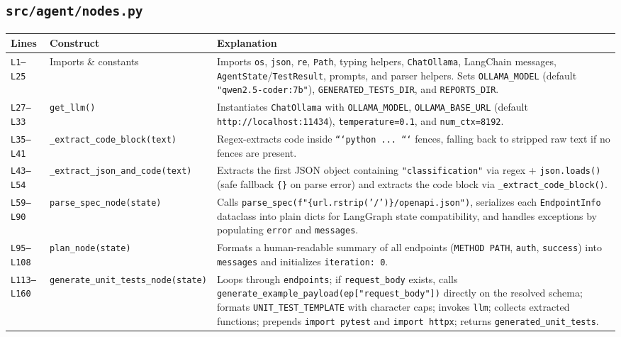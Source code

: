 \documentclass[11pt,a4paper]{article}
\begin{document}
\subsection{\texttt{src/agent/nodes.py}}
\begin{longtable}{L{1.4cm} L{5.2cm} L{9.0cm}}
\toprule
\textbf{Lines} & \textbf{Construct} & \textbf{Explanation} \\
\midrule
\endhead
\texttt{L1--L25} & Imports \& constants & Imports \texttt{os}, \texttt{json}, \texttt{re}, \texttt{Path}, typing helpers, \texttt{ChatOllama}, LangChain messages, \texttt{AgentState}/\texttt{TestResult}, prompts, and parser helpers. Sets \texttt{OLLAMA\_MODEL} (default \texttt{"qwen2.5-coder:7b"}), \texttt{GENERATED\_TESTS\_DIR}, and \texttt{REPORTS\_DIR}. \\
\texttt{L27--L33} & \texttt{get\_llm()} & Instantiates \texttt{ChatOllama} with \texttt{OLLAMA\_MODEL}, \texttt{OLLAMA\_BASE\_URL} (default \texttt{http://localhost:11434}), \texttt{temperature=0.1}, and \texttt{num\_ctx=8192}. \\
\texttt{L35--L41} & \texttt{\_extract\_code\_block(text)} & Regex-extracts code inside \texttt{```python ... ```} fences, falling back to stripped raw text if no fences are present. \\
\texttt{L43--L54} & \texttt{\_extract\_json\_and\_code(text)} & Extracts the first JSON object containing \texttt{"classification"} via regex + \texttt{json.loads()} (safe fallback \texttt{\{\}} on parse error) and extracts the code block via \texttt{\_extract\_code\_block()}. \\
\texttt{L59--L90} & \texttt{parse\_spec\_node(state)} & Calls \texttt{parse\_spec(f"\{url.rstrip('/')\}/openapi.json")}, serializes each \texttt{EndpointInfo} dataclass into plain dicts for LangGraph state compatibility, and handles exceptions by populating \texttt{error} and \texttt{messages}. \\
\texttt{L95--L108} & \texttt{plan\_node(state)} & Formats a human-readable summary of all endpoints (\texttt{METHOD PATH}, \texttt{auth}, \texttt{success}) into \texttt{messages} and initializes \texttt{iteration: 0}. \\
\texttt{L113--L160} & \texttt{generate\_unit\_tests\_node(state)} & Loops through \texttt{endpoints}; if \texttt{request\_body} exists, calls \texttt{generate\_example\_payload(ep["request\_body"])} directly on the resolved schema; formats \texttt{UNIT\_TEST\_TEMPLATE} with character caps; invokes \texttt{llm}; collects extracted functions; prepends \texttt{import pytest} and \texttt{import httpx}; returns \texttt{generated\_unit\_tests}. \\

\end{longtable}
\end{document}
